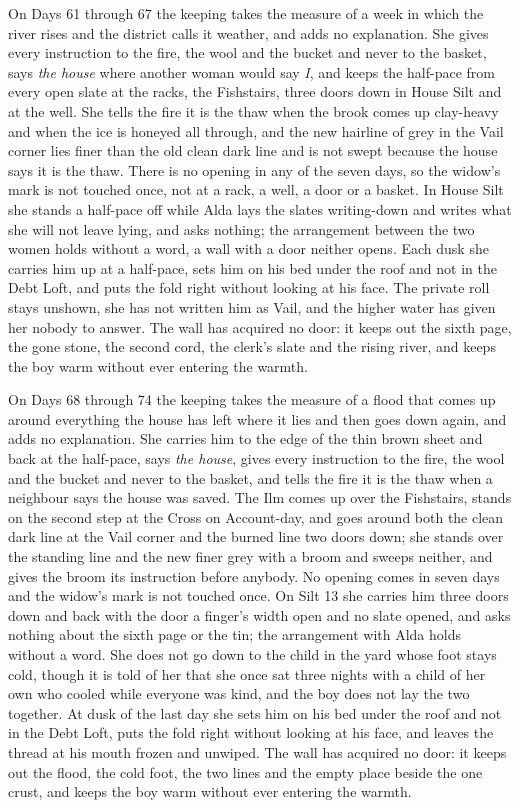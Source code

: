 \documentclass{design/chronicle}
\begin{document}
{On Days 61 through 67 the keeping takes the measure of a week in which the river rises and the district calls it weather, and adds no explanation. She gives every instruction to the fire, the wool and the bucket and never to the basket, says \emph{the house} where another woman would say \emph{I}, and keeps the half-pace from every open slate at the racks, the Fishstairs, three doors down in House Silt and at the well. She tells the fire it is the thaw when the brook comes up clay-heavy and when the ice is honeyed all through, and the new hairline of grey in the Vail corner lies finer than the old clean dark line and is not swept because the house says it is the thaw. There is no opening in any of the seven days, so the widow’s mark is not touched once, not at a rack, a well, a door or a basket. In House Silt she stands a half-pace off while Alda lays the slates writing-down and writes what she will not leave lying, and asks nothing; the arrangement between the two women holds without a word, a wall with a door neither opens. Each dusk she carries him up at a half-pace, sets him on his bed under the roof and not in the Debt Loft, and puts the fold right without looking at his face. The private roll stays unshown, she has not written him as Vail, and the higher water has given her nobody to answer. The wall has acquired no door: it keeps out the sixth page, the gone stone, the second cord, the clerk’s slate and the rising river, and keeps the boy warm without ever entering the warmth.

On Days 68 through 74 the keeping takes the measure of a flood that comes up around everything the house has left where it lies and then goes down again, and adds no explanation. She carries him to the edge of the thin brown sheet and back at the half-pace, says \emph{the house}, gives every instruction to the fire, the wool and the bucket and never to the basket, and tells the fire it is the thaw when a neighbour says the house was saved. The Ilm comes up over the Fishstairs, stands on the second step at the Cross on Account-day, and goes around both the clean dark line at the Vail corner and the burned line two doors down; she stands over the standing line and the new finer grey with a broom and sweeps neither, and gives the broom its instruction before anybody. No opening comes in seven days and the widow’s mark is not touched once. On Silt 13 she carries him three doors down and back with the door a finger’s width open and no slate opened, and asks nothing about the sixth page or the tin; the arrangement with Alda holds without a word. She does not go down to the child in the yard whose foot stays cold, though it is told of her that she once sat three nights with a child of her own who cooled while everyone was kind, and the boy does not lay the two together. At dusk of the last day she sets him on his bed under the roof and not in the Debt Loft, puts the fold right without looking at his face, and leaves the thread at his mouth frozen and unwiped. The wall has acquired no door: it keeps out the flood, the cold foot, the two lines and the empty place beside the one crust, and keeps the boy warm without ever entering the warmth.

}
\end{document}

